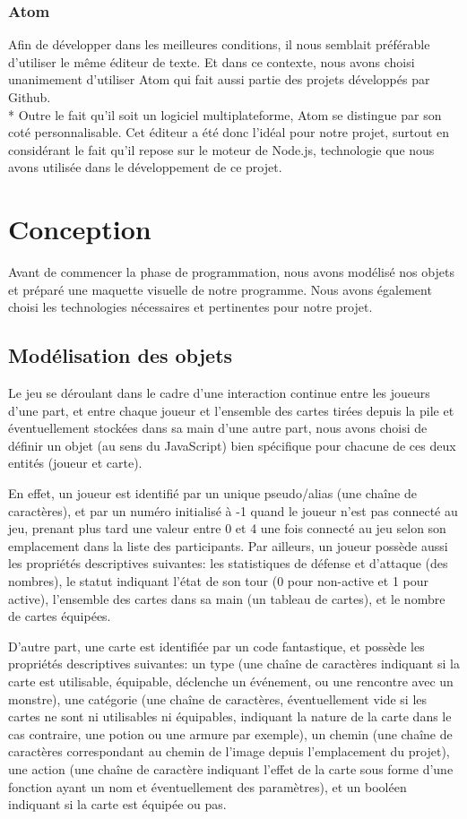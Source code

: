 \documentclass[12pt]{report}
\begin{document}
 \subsection*{Atom}
   Afin de développer dans les meilleures conditions, il nous semblait préférable d’utiliser le même éditeur de texte.
   Et dans ce contexte, nous avons choisi unanimement d’utiliser Atom qui fait aussi partie des projets développés  par Github.\\*
   Outre le fait qu’il soit un logiciel multiplateforme, Atom se distingue par son coté personnalisable.
   Cet éditeur a été donc l’idéal pour notre projet, surtout en considérant le fait qu’il repose sur le moteur de Node.js, technologie que nous avons utilisée  dans le développement de ce projet.
	 \vfill


\chapter{Conception}

	Avant de commencer la phase de programmation, nous avons modélisé nos objets et préparé une maquette visuelle de notre programme. Nous avons également choisi les technologies nécessaires et pertinentes pour notre projet.

    \section{Modélisation des objets}
		Le jeu se déroulant dans le cadre d'une interaction continue entre les joueurs d'une part, et entre chaque joueur et l'ensemble des cartes tirées depuis la pile et éventuellement stockées dans sa main d'une autre part, nous avons choisi de définir un objet (au sens du JavaScript) bien spécifique pour chacune de ces deux entités (joueur et carte).

		En effet, un joueur est identifié par un unique pseudo/alias (une chaîne de caractères), et par un numéro initialisé à -1 quand le joueur n'est pas connecté au jeu, prenant plus tard une valeur entre 0 et 4 une fois connecté au jeu selon son emplacement dans la liste des participants. Par ailleurs, un joueur possède aussi les propriétés descriptives suivantes: les statistiques de défense et d'attaque (des nombres), le statut indiquant l'état de son tour (0 pour non-active et 1 pour active), l'ensemble des cartes dans sa main (un tableau de cartes), et le nombre de cartes équipées.

		D'autre part, une carte est identifiée par un code fantastique, et possède les propriétés descriptives suivantes: un type (une chaîne de caractères indiquant si la carte est utilisable, équipable, déclenche un événement, ou une rencontre avec un monstre), une catégorie (une chaîne de caractères, éventuellement vide si les cartes ne sont ni utilisables ni équipables, indiquant la nature de la carte dans le cas contraire, une potion ou une armure par exemple), un chemin (une chaîne de caractères correspondant au chemin de l'image depuis l'emplacement du projet), une action (une chaîne de caractère indiquant l'effet de la carte sous forme d'une fonction ayant un nom et éventuellement des paramètres), et un booléen indiquant si la carte est équipée ou pas.
\end{document}
